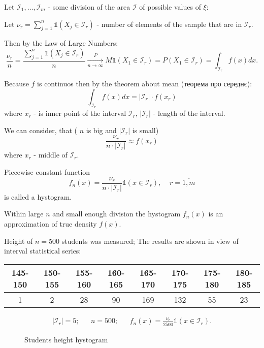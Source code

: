 Let  $\mathcal{I}_1, \ldots, \mathcal{I}_m$ - some division of the area $\mathcal{I}$ of possible values of  $\xi$:

Let $\nu_r = \sum_{j=1}^{n}  \mathds{1}(X_j \in \mathcal{I}_r)$ - number of elements of the sample that are in $\mathcal{I}_r$.

Then by the Law of Large Numbers:
\[
    \frac{\nu_r}{n} = \frac{\sum_{j=1}^{n} \mathds{1}(X_j \in \mathcal{I}_r)}{n}
    \underset{n\to\infty}{\overset{P}{\to}}
    M \mathds{1}(X_1 \in \mathcal{I}_r) = P(X_1 \in \mathcal{I}_r) =
    \int_{\mathcal{I}_r}^{} f(x) dx 
.\] 

Because $f$ is continuos then by the theorem about mean (теорема про середнє):
\[
    \int_{\mathcal{I}_r}^{}  f(x) dx =  \left| \mathcal{I}_r \right| \cdot f(x_r)
\] 
where $x_r$ - is inner point of the interval $\mathcal{I}_r$, $\left| \mathcal{I}_r \right| $ - length of the interval.

We can consider, that ( $n$ is big and $\left| \mathcal{I}_r \right| $ is small)
\[
    \frac{\nu_r}{n \cdot \left| \mathcal{I}_r \right| } \approx f(x_r)
\] 
where $x_r$ - middle of  $\mathcal{I}_r$.

\begin{definition}
    Piecewise constant function
    \[
        f_n(x) = \frac{\nu_r}{n \cdot \left| \mathcal{I}_r \right| } \mathds{1}(x \in \mathcal{I}_r), \;\;\;\; r = \overline{1, m}
    \] 
    is called a hystogram.
\end{definition}

Within large $n$ and small enough division the hystogram $f_n(x)$ is
an approximation of true density $f(x)$.

\begin{example}
    Height of $n=500$ students was measured; The results are shown in view of
    interval statistiсal series:

\begin{center}
    \begin{tabular}{|c | c | c | c | c | c | c | c|}
        \hline
        145-150 & 150-155 & 155-160 & 160-165 & 165-170 & 170-175 & 175-180 & 180-185 \\
        \hline
        1 & 2 & 28 & 90 & 169 & 132 & 55 & 23 \\
        \hline
    \end{tabular}
\end{center}

\begin{align*}
    \left| \mathcal{I}_r \right| = 5; && n = 500; && f_n(x) = \frac{\nu_r}{ 2500} \mathds{1}(x \in \mathcal{I}_r)
.\end{align*}

\begin{figure}[ht]
    \centering
    \caption{Students height hystogram}
    \label{fig:students-height-hystogram}
\end{figure}

\end{example}

